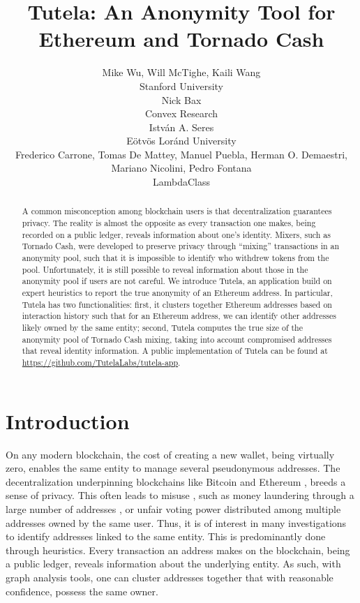 \documentclass[11pt,a4paper]{article}
\title{Tutela: An Anonymity Tool for Ethereum and Tornado Cash}
\author{
  \small{Mike Wu, Will McTighe, Kaili Wang}\\
  \small{Stanford University} \\ \And
  \small{Nick Bax} \\
  \small{Convex Research} \\ \And
  \small{Istv\'{a}n A. Seres} \\
  \small{E\"{o}tv\"{o}s Lor\'{a}nd University} \\ \AND
  \small{Frederico Carrone, Tomas De Mattey, Manuel Puebla, Herman O. Demaestri, Mariano Nicolini, Pedro Fontana} \\
  \small{LambdaClass} \\}
\date{}
\begin{document}
\maketitle
\begin{abstract}
A common misconception among blockchain users is that decentralization guarantees privacy. The reality is almost the opposite as every transaction one makes, being recorded on a public ledger, reveals information about one's identity.
Mixers, such as Tornado Cash, were developed to preserve privacy through ``mixing'' transactions in an anonymity pool, such that it is impossible to identify who withdrew tokens from the pool. Unfortunately, it is still possible to reveal information about those in the anonymity pool if users are not careful.
We introduce Tutela, an application build on expert heuristics to report the true anonymity of an Ethereum address.
In particular, Tutela has two functionalities: first, it clusters together Ethereum addresses based on interaction history such that for an Ethereum address, we can identify other addresses likely owned by the same entity; second, Tutela computes the true size of the anonymity pool of Tornado Cash mixing, taking into account compromised addresses that reveal identity information. A public implementation of Tutela can be found at \url{https://github.com/TutelaLabs/tutela-app}.
\end{abstract}

\section{Introduction}

On any modern blockchain, the cost of creating a new wallet, being virtually zero, enables the same entity to manage several pseudonymous addresses. The decentralization underpinning blockchains like Bitcoin \citep{nakamoto2008bitcoin} and Ethereum \citep{buterin2013ethereum}, breeds a sense of privacy. This often leads to misuse \citep{christin2013traveling}, such as money laundering through a large number of addresses \citep{moser2013inquiry}, or unfair voting power distributed among multiple addresses owned by the same user. Thus, it is of interest in many investigations to identify addresses linked to the same entity. This is predominantly done through heuristics. Every transaction an address makes on the blockchain, being a public ledger, reveals information about the underlying entity. As such, with graph analysis tools, one can cluster addresses together that with reasonable confidence, possess the same owner.
\end{document}
